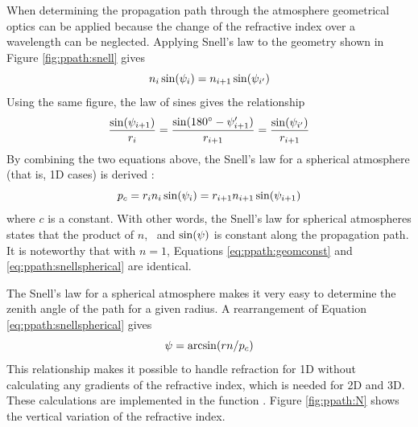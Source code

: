 When determining the propagation path through the atmosphere
geometrical optics can be applied because the change of the refractive
index over a wavelength can be neglected. Applying Snell's law
to the geometry shown in Figure
\ref{fig:ppath:snell} gives
\begin{equation}
  n_i \sin (\psi_{i}) = n_{i+1} \sin (\psi_{i'})
\end{equation}
Using the same figure, the law of sines gives the relationship
\begin{equation}
  \frac{\sin(\psi_{i+1})}{r_{i}} = 
  \frac{\sin(180^\circ-\psi_{i+1}')}{r_{i+1}} =
  \frac{\sin(\psi_{i'})}{r_{i+1}} 
\end{equation}
By combining the two equations above, the Snell's law for a spherical
atmosphere (that is, 1D cases) is derived
\citep[e.g.][]{kyle:91,balluch:97}:
\begin{equation}
  p_c = r_{i} n_i \sin(\psi_{i}) = r_{i+1} n_{i+1}\sin(\psi_{i+1}) 
 \label{eq:ppath:snellspherical}
\end{equation}
where $c$ is a constant. With other words, the Snell's law for
spherical atmospheres states that the product of $n$, \Rds\ and
$\sin(\psi)$ is constant along the propagation path. It is
noteworthy that with $n=1$, Equations \ref{eq:ppath:geomconst} and
\ref{eq:ppath:snellspherical} are identical.

The Snell's law for a spherical atmosphere makes it very easy to
determine the zenith angle of the path for a given radius. A
rearrangement of Equation \ref{eq:ppath:snellspherical} gives
\begin{equation}
  \psi = \arcsin( r n / p_c )
 \label{eq:ppath:za1D}
\end{equation}
This relationship makes it possible to handle refraction for 1D
without calculating any gradients of the refractive index, which is
needed for 2D and 3D. These calculations are implemented in the
function .
Figure \ref{fig:ppath:N} shows the vertical variation of the
refractive index.






